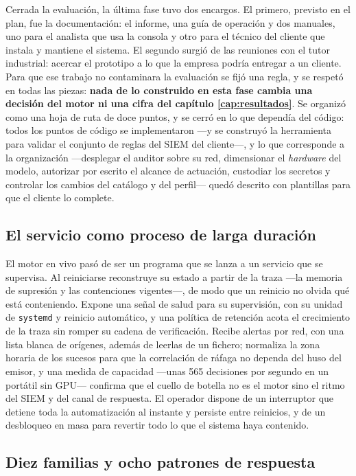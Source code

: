 Cerrada la evaluación, la última fase tuvo dos encargos. El primero, previsto en el plan, fue la
documentación: el informe, una guía de operación y dos manuales, uno para el analista que usa la
consola y otro para el técnico del cliente que instala y mantiene el sistema. El segundo surgió de
las reuniones con el tutor industrial: acercar el prototipo a lo que la empresa podría entregar a
un cliente. Para que ese trabajo no contaminara la evaluación se fijó una regla, y se respetó en
todas las piezas: \textbf{nada de lo construido en esta fase cambia una decisión del motor ni una
cifra del capítulo \ref{cap:resultados}}. Se organizó como una hoja de ruta de doce puntos, y se
cerró en lo que dependía del código: todos los puntos de código se implementaron ---y se construyó la
herramienta para validar el conjunto de reglas del SIEM del cliente---, y lo que corresponde a la
organización ---desplegar el auditor sobre su red, dimensionar el \emph{hardware} del modelo, autorizar
por escrito el alcance de actuación, custodiar los secretos y controlar los cambios del catálogo y
del perfil--- quedó descrito con plantillas para que el cliente lo complete.

\subsection{El servicio como proceso de larga duración}

El motor en vivo pasó de ser un programa que se lanza a un servicio que se supervisa. Al
reiniciarse reconstruye su estado a partir de la traza ---la memoria de supresión y las
contenciones vigentes---, de modo que un reinicio no olvida qué está conteniendo. Expone una señal
de salud para su supervisión, con su unidad de \texttt{systemd} y reinicio automático, y una política
de retención acota el crecimiento de la traza sin romper su cadena de verificación. Recibe alertas
por red, con una lista blanca de orígenes, además de leerlas de un fichero; normaliza la zona
horaria de los sucesos para que la correlación de ráfaga no dependa del huso del emisor, y una
medida de capacidad ---unas 565 decisiones por segundo en un portátil sin GPU--- confirma que el
cuello de botella no es el motor sino el ritmo del SIEM y del canal de respuesta. El operador
dispone de un interruptor que detiene toda la automatización al instante y persiste entre
reinicios, y de un desbloqueo en masa para revertir todo lo que el sistema haya contenido.

\subsection{Diez familias y ocho patrones de respuesta}

